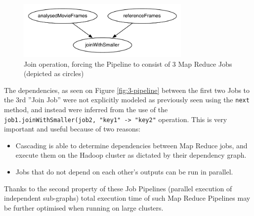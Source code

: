 \begin{figure}[ch!]
  \centering
  \includegraphics[width=0.75\textwidth]{img/second-simplest-pipeline}
  \caption{Join operation, forcing the Pipeline to consist of 3 Map Reduce Jobs (depicted as circles)}
\end{figure}


The dependencies, as seen on Figure \ref{fig:3-pipeline} between the first two Jobs to the 3rd ''Join Job'' were not explicitly modeled as previously seen using the \verb|next| method, and instead were inferred from the use of the \verb|job1.joinWithSmaller(job2, "key1" -> "key2"| operation. This is very important and useful because of two reasons:

\begin{itemize}
  \item Cascading is able to determine dependencies between Map Reduce jobs, and execute them on the Hadoop cluster as dictated by their dependency graph.
  \item Jobs that do not depend on each other's outputs can be run in parallel.
\end{itemize}

Thanks to the second property of these Job Pipelines (parallel execution of independent sub-graphs) total execution time of such Map Reduce Pipelines may be further optimised when running on large clusters.





